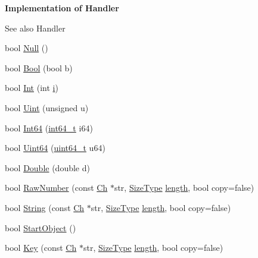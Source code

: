 \begin{Indent}\textbf{ Implementation of Handler}\par
{\em \begin{DoxySeeAlso}{See also}
Handler 
\end{DoxySeeAlso}
}\begin{DoxyCompactItemize}
\item 
bool \hyperlink{classPrettyWriter_aa144f2d0f0c3c69248cdbe957349528c}{Null} ()
\item 
bool \hyperlink{classPrettyWriter_a6e765ee7ada5ed40f317c78a98f6f90b}{Bool} (bool b)
\item 
bool \hyperlink{classPrettyWriter_aa1815263e61cb7af3b6dfba480a0f481}{Int} (int \hyperlink{game__play__state_8cpp_acb559820d9ca11295b4500f179ef6392}{i})
\item 
bool \hyperlink{classPrettyWriter_a8c82302877a5588eae77eb7d042c49ef}{Uint} (unsigned u)
\item 
bool \hyperlink{classPrettyWriter_ad42b797429f4ee19efdce610f5aff976}{Int64} (\hyperlink{stdint_8h_a414156feea104f8f75b4ed9e3121b2f6}{int64\+\_\+t} i64)
\item 
bool \hyperlink{classPrettyWriter_aba75ac1f13c2629b2a55ffbf3d8a116c}{Uint64} (\hyperlink{stdint_8h_aec6fcb673ff035718c238c8c9d544c47}{uint64\+\_\+t} u64)
\item 
bool \hyperlink{classPrettyWriter_ad9d592e86b985da666665926e87db415}{Double} (double d)
\item 
bool \hyperlink{classPrettyWriter_a3941bc21d6a261ca8a86eff330db30ef}{Raw\+Number} (const \hyperlink{classPrettyWriter_ae35c89bda4c5d59d3ff6efcf2fea45a3}{Ch} $\ast$str, \hyperlink{rapidjson_8h_a5ed6e6e67250fadbd041127e6386dcb5}{Size\+Type} \hyperlink{imgui__impl__opengl3__loader_8h_a011fc24f10426c01349e94a4edd4b0d5}{length}, bool copy=false)
\item 
bool \hyperlink{classPrettyWriter_ae544ccfe35dd7e80ed694873062409f6}{String} (const \hyperlink{classPrettyWriter_ae35c89bda4c5d59d3ff6efcf2fea45a3}{Ch} $\ast$str, \hyperlink{rapidjson_8h_a5ed6e6e67250fadbd041127e6386dcb5}{Size\+Type} \hyperlink{imgui__impl__opengl3__loader_8h_a011fc24f10426c01349e94a4edd4b0d5}{length}, bool copy=false)
\item 
bool \hyperlink{classPrettyWriter_a27bdda225dc152b8974e44c1df7525b7}{Start\+Object} ()
\item 
bool \hyperlink{classPrettyWriter_a20ecbe1d31a871e4da4a3899b40ad3cd}{Key} (const \hyperlink{classPrettyWriter_ae35c89bda4c5d59d3ff6efcf2fea45a3}{Ch} $\ast$str, \hyperlink{rapidjson_8h_a5ed6e6e67250fadbd041127e6386dcb5}{Size\+Type} \hyperlink{imgui__impl__opengl3__loader_8h_a011fc24f10426c01349e94a4edd4b0d5}{length}, bool copy=false)

\end{DoxyCompactItemize}
\end{Indent}
